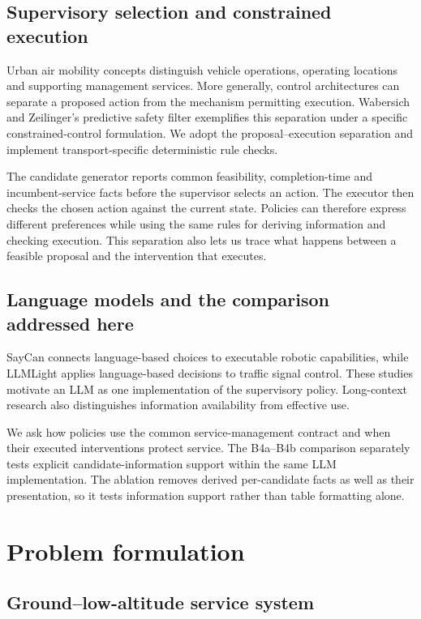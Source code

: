 \documentclass[]{interact}
\theoremstyle{plain}
\theoremstyle{definition}
\theoremstyle{remark}
\begin{document}
\subsection{Supervisory selection and constrained execution}

Urban air mobility concepts distinguish vehicle operations, operating locations and supporting management services. \citep{ref7} More generally, control architectures can separate a proposed action from the mechanism permitting execution. Wabersich and Zeilinger's predictive safety filter exemplifies this separation under a specific constrained-control formulation. \citep{ref8} We adopt the proposal--execution separation and implement transport-specific deterministic rule checks.

The candidate generator reports common feasibility, completion-time and incumbent-service facts before the supervisor selects an action. The executor then checks the chosen action against the current state. Policies can therefore express different preferences while using the same rules for deriving information and checking execution. This separation also lets us trace what happens between a feasible proposal and the intervention that executes.

\subsection{Language models and the comparison addressed here}

SayCan connects language-based choices to executable robotic capabilities, while LLMLight applies language-based decisions to traffic signal control. \citep{ref9,ref10} These studies motivate an LLM as one implementation of the supervisory policy. Long-context research also distinguishes information availability from effective use. \citep{ref11}

We ask how policies use the common service-management contract and when their executed interventions protect service. The B4a--B4b comparison separately tests explicit candidate-information support within the same LLM implementation. The ablation removes derived per-candidate facts as well as their presentation, so it tests information support rather than table formatting alone.

\section{Problem formulation}

\subsection{Ground--low-altitude service system}
\end{document}
